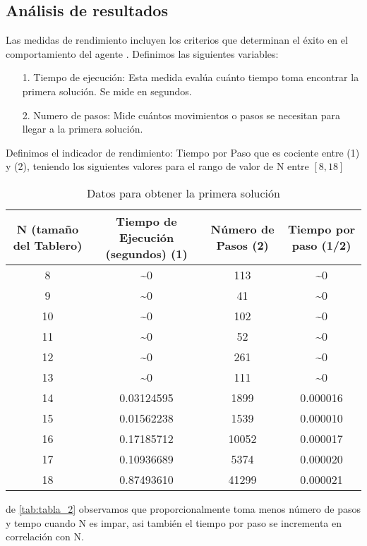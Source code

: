 \documentclass[conference]{IEEEtran}
\begin{document}
\subsection{Análisis de resultados}
Las medidas de rendimiento incluyen los criterios que determinan el éxito en el comportamiento del agente \cite{r2}. Definimos las siguientes variables:
\begin{itemize}
\item[1.] Tiempo de ejecución: Esta medida evalúa cuánto tiempo toma encontrar la primera solución. Se mide en segundos.
\item[2.] Numero de pasos: Mide cuántos movimientos o pasos se necesitan para llegar a la primera solución.
\end{itemize}
Definimos el indicador de rendimiento: Tiempo por Paso que es cociente entre (1) y (2), teniendo los siguientes valores para el rango de valor de N entre $[8,18]$

\begin{table}[htbp]
\caption{Datos para obtener la primera solución}
\centering
\begin{center}
\begin{tabularx}{\columnwidth}{|C|C|C|C|}
\hline
N (tamaño del Tablero) & Tiempo de Ejecución (segundos) (1) & Número de Pasos (2) & Tiempo por paso (1/2) \\
 & \textasciitilde 0 & 113 & \textasciitilde 0 \\
9 & \textasciitilde 0 & 41 & \textasciitilde 0 \\
10 & \textasciitilde 0 & 102 & \textasciitilde 0 \\
11 & \textasciitilde 0 & 52 & \textasciitilde 0 \\
12 & \textasciitilde 0 & 261 & \textasciitilde 0 \\
13 & \textasciitilde 0 & 111 & \textasciitilde 0 \\
14 & 0.03124595 & 1899 & 0.000016 \\
15 & 0.01562238 & 1539 & 0.000010 \\
16 & 0.17185712 & 10052 & 0.000017 \\
17 & 0.10936689 & 5374 & 0.000020 \\
18 & 0.87493610 & 41299 & 0.000021 \\
\hline
\end{tabularx}
\label{tab:tabla_2}
\end{center}
\end{table}

de \autoref{tab:tabla_2} observamos que proporcionalmente toma menos número de pasos y tempo cuando N es impar, asi también el tiempo por paso se incrementa en correlación con N.
\end{document}
